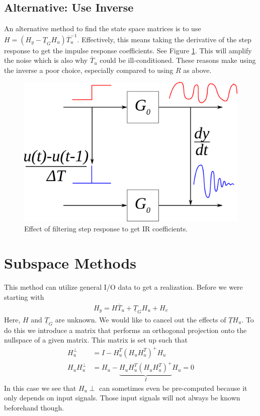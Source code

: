 \documentclass[lecture,12pt,]{pcms-l}
\begin{document}
\subsection{Alternative: Use Inverse}
An alternative method to find the state space matrices is to use $H=(H_y-\underline{T}_GH_u)\overline{T}_u^{-1}$. Effectively, this means taking the derivative of the step response to get the impulse response coefficients. See Figure \ref{fig:11filter}. This will amplify the noise which is also why $\overline{T}_u$ could be ill-conditioned. These reasons make using the inverse a poor choice, especially compared to using $R$ as above.

\begin{figure}[ht!]
	\centering
	\includegraphics[width=.5\textwidth]{images/11filter}
	\caption{Effect of filtering step response to get IR coefficients.}
	\label{fig:11filter}
\end{figure}

\section{Subspace Methods}
This method can utilize general I/O data to get a realization. Before we were starting with
\begin{align}
\label{eq:hy}
H_y=H\overline{T}_u+\underline{T}_GH_u+H_v
\end{align}
Here, $H$ and $\underline{T}_G$ are unknown. We would like to cancel out the effects of $\underline{T}H_u$. To do this we introduce a matrix that performs an orthogonal projection onto the nullspace of a given matrix. This matrix is set up such that
\begin{align*}
H_u^\perp &= I-H_u^T(H_uH_u^T)^+H_u \\
H_uH_u^\perp &= H_u - \underbrace{H_uH_u^T(H_uH_u^T)^+}_{I}H_u = 0
\end{align*}
In this case we see that $H_u\perp$ can sometimes even be pre-computed because it only depends on input signals. Those input signals will not always be known beforehand though.
\end{document}
